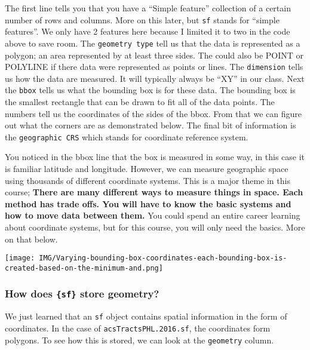 \documentclass[
]{article}
\newenvironment{Shaded}{\begin{snugshade}}{\end{snugshade}}
\newcommand{\FloatTok}[1]{\textcolor[rgb]{0.00,0.00,0.81}{#1}}
\newcommand{\NormalTok}[1]{#1}
\newcommand{\SpecialCharTok}[1]{\textcolor[rgb]{0.00,0.00,0.00}{#1}}
\begin{document}
The first line tells you that you have a ``Simple feature'' collection
of a certain number of rows and columns. More on this later, but
\texttt{sf} stands for ``simple features''. We only have 2 features here
because I limited it to two in the code above to save room. The
\texttt{geometry\ type} tell us that the data is represented as a
polygon; an area represented by at least three sides. The could also be
POINT or POLYLINE if there data were represented as points or lines. The
\texttt{dimension} tells us how the data are measured. It will typically
always be ``XY'' in our class. Next the \texttt{bbox} tells us what the
bounding box is for these data. The bounding box is the smallest
rectangle that can be drawn to fit all of the data points. The numbers
tell us the coordinates of the sides of the bbox. From that we can
figure out what the corners are as demonstrated below. The final bit of
information is the \texttt{geographic\ CRS} which stands for coordinate
reference system.

You noticed in the bbox line that the box is measured in some way, in
this case it is familiar latitude and longitude. However, we can measure
geographic space using thousands of different coordinate systems. This
is a major theme in this course; \textbf{There are many different ways
to measure things in space. Each method has trade offs. You will have to
know the basic systems and how to move data between them.} You could
spend an entire career learning about coordinate systems, but for this
course, you will only need the basics. More on that below.

\texttt{[image: IMG/Varying-bounding-box-coordinates-each-bounding-box-is-created-based-on-the-minimum-and.png]}

\hypertarget{how-does-sf-store-geometry}{%
\subsubsection{\texorpdfstring{How does \texttt{\{sf\}} store
geometry?}{How does \{sf\} store geometry?}}\label{how-does-sf-store-geometry}}

We just learned that an \texttt{sf} object contains spatial information
in the form of coordinates. In the case of
\texttt{acsTractsPHL.2016.sf}, the coordinates form polygons. To see how
this is stored, we can look at the \texttt{geometry} column.

\begin{Shaded}
\end{Shaded}
\end{document}
